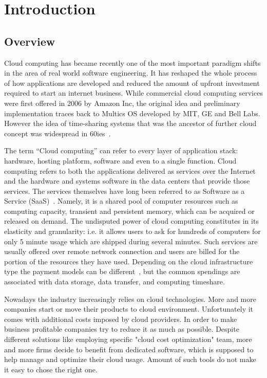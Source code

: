 \documentclass[licencjacka,en]{thesisclass}
\begin{document}
    \chapter{Introduction}


    \section{Overview}

    Cloud computing has became recently one of the most important paradigm shifts in the area of real world software engineering.
    It has reshaped the whole process of how applications are developed and reduced the amount of upfront
    investment required to start an internet business. While commercial cloud computing services were first offered
    in 2006 by Amazon Inc, the original idea and preliminary implementation traces back to Multics OS developed by MIT,
    GE and Bell Labs. However the idea of time-sharing systems that was the ancestor of further cloud
    concept was widespread in 60ies~\cite{Markus}.

    The term “Cloud computing” can refer to every layer of application stack:
    hardware, hosting platform, software and even to a single function.
    Cloud computing refers to both the applications delivered as services over the Internet and
    the hardware and systems software in the data centers that provide those services.
    The services themselves have long been referred to as Software as a Service (SaaS)~\cite{Armbrust}.
    Namely, it is a shared pool of computer resources such as computing capacity,
    transient and persistent memory, which can be acquired or released on demand.
    The undisputed power of cloud computing constitutes in its elasticity and granularity:
    i.e. it allows users to ask for hundreds of computers for only 5 minute usage which
    are shipped during several minutes.
    Such services are usually offered over remote network connection and users are billed
    for the portion of the resources they have used.
    Depending on the cloud infrastructure type the payment models can be different~\cite{Laatikainen},
    but the common spendings are associated with data storage, data transfer, and computing timeshare.

    Nowadays the industry increasingly relies on cloud technologies. More and more companies start or move their products to cloud environment.
    Unfortunately it comes with additional costs imposed by cloud providers.
    In order to make business profitable companies try to reduce it as much as possible. Despite different solutions like employing specific "cloud cost optimization" team, more and more firms decide to benefit from dedicated software, which is supposed to help manage and optimize their cloud usage. Amount of such tools do not make it easy to chose the right one.
\end{document}
